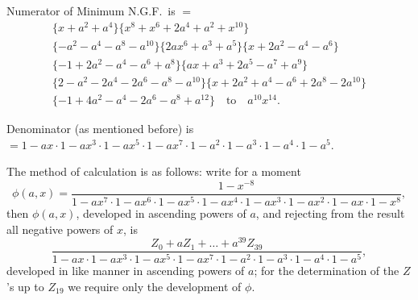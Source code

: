 \documentclass[11pt,a4paper]{book}
\begin{document}
Numerator of Minimum N.G.F.\ is $=$
\begin{multline*}
\{x + a^2 + a^4\} \{x^8 + x^6 + 2a^4 + a^2 + x^{10}\} \\
\{-a^2 - a^4 - a^8 - a^{10}\} \{2ax^6 + a^3 + a^5\} \{x + 2a^2 - a^4 - a^6\} \\
\{-1 + 2a^2 - a^4 - a^6 + a^8\} \{ax + a^3 + 2a^5 - a^7 + a^9\} \\
\{2 - a^2 - 2a^4 - 2a^6 - a^8 - a^{10}\} \{x + 2a^2 + a^4 - a^6 + 2a^8 - 2a^{10}\} \\
\{-1 + 4a^2 - a^4 - 2a^6 - a^8 + a^{12}\} \quad \text{to} \quad a^{10}x^{14}.
\end{multline*}

Denominator (as mentioned before) is $= 1 - ax \cdot 1 - ax^3 \cdot 1 - ax^5 \cdot 1 - ax^7 \cdot 1 - a^2 \cdot 1 - a^3 \cdot 1 - a^4 \cdot 1 - a^5$.

\clearpage
The method of calculation is as follows: write for a moment
\[
\phi(a, x) = \frac{1 - x^{-8}}{1 - ax^7 \cdot 1 - ax^6 \cdot 1 - ax^5 \cdot 1 - ax^4 \cdot 1 - ax^3 \cdot 1 - ax^2 \cdot 1 - ax \cdot 1 - x^8},
\]
then $\phi(a, x)$, developed in ascending powers of $a$, and rejecting from the result all negative powers of $x$, is
\[
\frac{Z_0 + aZ_1 + \dots + a^{39}Z_{39}}{1 - ax \cdot 1 - ax^3 \cdot 1 - ax^5 \cdot 1 - ax^7 \cdot 1 - a^2 \cdot 1 - a^3 \cdot 1 - a^4 \cdot 1 - a^5},
\]
developed in like manner in ascending powers of $a$; for the determination of the $Z$'s up to $Z_{19}$ we require only the development of $\phi$.
\end{document}
